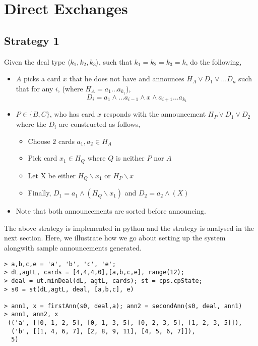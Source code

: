 \section{Direct Exchanges}

\subsection{Strategy 1}

Given the deal type $\langle k_1, k_2, k_3 \rangle$,
such that $k_1 = k_2 = k_3 = k$, do the following,

\begin{itemize}
  \item $A$ picks a card $x$ that he does not have and 
    announces $H_A \vee D_1 \vee \hdots D_n$ such that for 
    any $i$, (where $H_A = a_1 \hdots a_{k_1}$),
    \[ D_i = a_1 \wedge \hdots a_{i-1} \wedge  x \wedge a_{i+1} \hdots a_{k_1} \]
  \item $P \in \{B,C\}$, who has card $x$ responds with the announcement
    $H_P \vee D_1 \vee D_2$ where the $D_i$ are constructed as follows,
    \begin{itemize}
      \item Choose $2$ cards $a_1,a_2 \in H_A$ 
      \item Pick card $x_1 \in H_{Q}$ where $Q$ is neither $P$ nor $A$
      \item Let X be either $H_{Q} \backslash x_1$ or $H_P \backslash x$
      \item Finally, $D_1 = a_1 \wedge (H_Q \backslash x_1)$ and 
        $D_2 = a_2 \wedge (X)$
    \end{itemize}
  \item Note that both announcements are sorted before announcing.
\end{itemize}
The above strategy is implemented in python and the strategy is 
analysed in the next section. Here, we illustrate how we go about
setting up the system alongwith sample announcements generated.
\begin{verbatim}
> a,b,c,e = 'a', 'b', 'c', 'e'; 
> dL,agtL, cards = [4,4,4,0],[a,b,c,e], range(12); 
> deal = ut.minDeal(dL, agtL, cards); st = cps.cpState; 
> s0 = st(dL,agtL, deal, [a,b,c], e)

> ann1, x = firstAnn(s0, deal,a); ann2 = secondAnn(s0, deal, ann1) 
> ann1, ann2, x
 (('a', [[0, 1, 2, 5], [0, 1, 3, 5], [0, 2, 3, 5], [1, 2, 3, 5]]),
  ('b', [[1, 4, 6, 7], [2, 8, 9, 11], [4, 5, 6, 7]]),
  5)
\end{verbatim}

